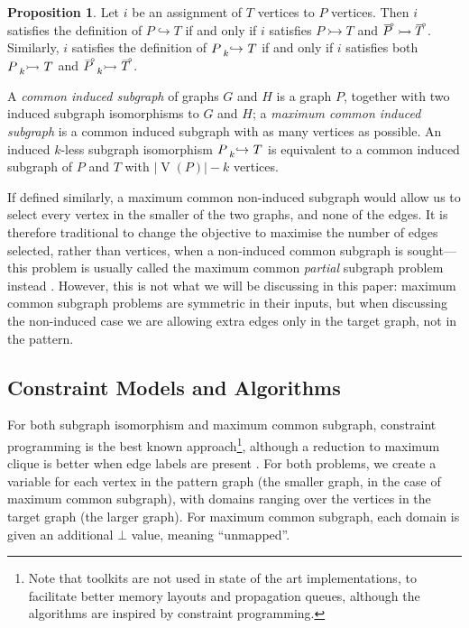\documentclass[letterpaper]{article}
\newcommand{\citep}[1]{\cite{#1}}
\theoremstyle{definition}
\newtheorem{proposition}{Proposition}
\newcommand{\lessnonind}[1]{\prescript{}{#1}{\rightarrowtail}\ }
\newcommand{\lessind}[1]{\prescript{}{#1}{\hookrightarrow}\ }
\newcommand{\V}{\operatorname{V}}
\newcommand{\loopcomp}[1]{\tset{\multimap}{#1}}
\newcommand{\tset}[2]{%
    \tikz[baseline=(X.base),inner sep=0pt,outer sep=0pt]{%
        \node[inner sep=0pt,outer sep=0pt] (X) {$#2$};
        \node[yshift=1.5pt,xshift=1pt] at (X.north) {$\scriptstyle#1$};
}}
\begin{document}
\begin{proposition}
    \label{prop:comp}
Let $i$ be an assignment of $T$ vertices to $P$ vertices.  Then $i$ satisfies the definition of $P
\hookrightarrow T$ if and only if $i$ satisfies $P \rightarrowtail T$ and
$\loopcomp{P} \rightarrowtail \loopcomp{T}$.
Similarly, $i$ satisfies the definition of $P
\lessind{k} T$ if and only if $i$ satisfies both $P \lessnonind{k} T$ and
$\loopcomp{P}
\lessnonind{k} \loopcomp{T}$.
\end{proposition}

A \emph{common induced subgraph} of graphs $G$ and $H$ is a graph $P$, together with two induced subgraph
isomorphisms to $G$ and $H$; a \emph{maximum common induced subgraph} is a common induced subgraph with as
many vertices as possible. An induced $k$-less subgraph isomorphism $P \lessind{k} T$ is equivalent
to a common induced subgraph of $P$ and $T$ with $\left|\V(P)\right| - k$ vertices.

If defined similarly, a maximum common non-induced subgraph would allow us to select every vertex in
the smaller of the two graphs, and none of the edges. It is therefore traditional to change the
objective to maximise the number of edges selected, rather than vertices, when a non-induced common
subgraph is sought---this problem is usually called the maximum common \emph{partial} subgraph
problem instead \citep{DBLP:conf/cp/NdiayeS11}. However, this is not what we will be discussing in
this paper: maximum common subgraph problems are symmetric in their inputs, but when discussing the
non-induced case we are allowing extra edges only in the target graph, not in the pattern.

\subsection{Constraint Models and Algorithms}

For both subgraph isomorphism and maximum common subgraph, constraint programming is the best known
approach\footnote{Note that toolkits are not used in state of the art implementations, to facilitate
better memory layouts and propagation queues, although the algorithms are inspired by
constraint programming.}, although a reduction to maximum clique is better when edge labels are
present \citep{DBLP:conf/cp/NdiayeS11,DBLP:conf/cp/McCreeshNPS16}. For both problems, we create a variable for each vertex
in the pattern graph (the smaller graph, in the case of maximum common subgraph), with domains
ranging over the vertices in the target graph (the larger graph). For maximum common subgraph, each
domain is given an additional $\bot$ value, meaning ``unmapped''.
\end{document}
